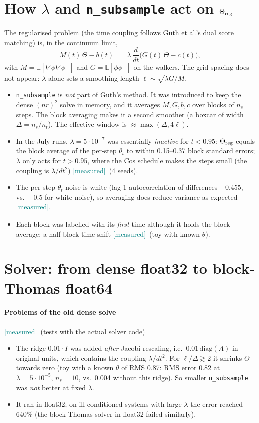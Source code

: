 \documentclass[11pt,a4paper]{article}
\newcommand{\code}[1]{\texttt{#1}}
\newcommand{\meas}{\textcolor{teal}{\textsf{[measured]}}}
\begin{document}
\section{How $\lambda$ and \code{n\_subsample} act on $\Theta_{\rm reg}$}
The regularised problem (the time coupling follows Guth et al.'s dual score matching)
is, in the continuum limit,
\[
  M(t)\,\Theta - b(t) \;=\; \lambda\,\frac{d}{dt}\big(G(t)\,\dot\Theta - c(t)\big),
\]
with $M=\mathbb E[\nabla\phi\nabla\phi^\top]$ and $G=\mathbb E[\phi\phi^\top]$ on the walkers.
The grid spacing does not appear: $\lambda$ alone sets a smoothing length
$\ell\sim\sqrt{\lambda G/M}$.
\begin{itemize}
  \item \code{n\_subsample} is \emph{not} part of Guth's method. It was introduced to keep
        the dense $(n r)^2$ solve in memory, and it averages $M,G,b,c$ over blocks of
        $n_s$ steps. The block averaging makes it a second smoother (a boxcar of width
        $\Delta=n_s/n_t$). The effective window is $\approx\max(\Delta,4\ell)$.
  \item In the July runs, $\lambda=5\cdot10^{-7}$ was essentially \emph{inactive} for $t<0.95$:
        $\Theta_{\rm reg}$ equals the block average of the per-step $\theta_t$ to within
        0.15--0.37 block standard errors; $\lambda$ only acts for $t>0.95$, where the Cos
        schedule makes the steps small (the coupling is $\lambda/dt^2$) \meas\ (4 seeds).
  \item The per-step $\theta_t$ noise is white (lag-1 autocorrelation of differences
        $-0.455$, vs.\ $-0.5$ for white noise), so averaging does reduce variance as expected \meas.
  \item Each block was labelled with its \emph{first} time although it holds the block
        average: a half-block time shift \meas\ (toy with known $\theta$).
\end{itemize}

\section{Solver: from dense float32 to block-Thomas float64}
\paragraph{Problems of the old dense solve} \meas\ (tests with the actual solver code)
\begin{itemize}
  \item The ridge $0.01\cdot I$ was added \emph{after} Jacobi rescaling, i.e.\ $0.01\,\mathrm{diag}(A)$
        in original units, which contains the coupling $\lambda/dt^2$. For $\ell/\Delta\gtrsim2$
        it shrinks $\Theta$ towards zero (toy with a known $\theta$ of RMS 0.87: RMS error 0.82
        at $\lambda=5\cdot10^{-5}$, $n_s=10$, vs.\ 0.004 without this ridge). So smaller \code{n\_subsample} was \emph{not} better at fixed $\lambda$.
  \item It ran in float32; on ill-conditioned systems with large $\lambda$ the error reached
        640\% (the block-Thomas solver in float32 failed similarly).
\end{itemize}
\end{document}
